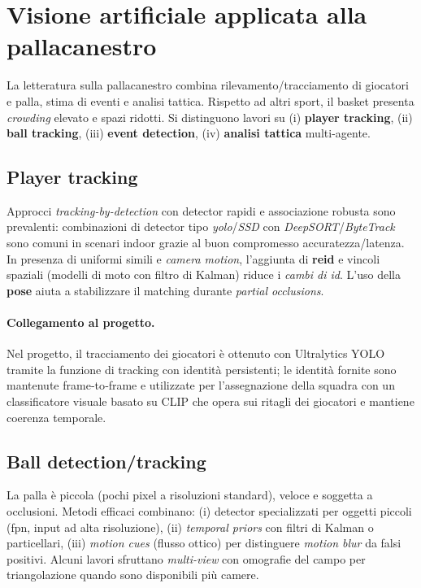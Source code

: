 \documentclass[12pt,a4paper,openright,twoside]{book}
\begin{document}
\section{Visione artificiale applicata alla pallacanestro}
\label{sec:cv-applicata-basket}

La letteratura sulla pallacanestro combina rilevamento/tracciamento di giocatori e palla, stima di eventi e analisi tattica.
Rispetto ad altri sport, il basket presenta \emph{crowding} elevato e spazi ridotti. Si distinguono lavori su 
(i) \textbf{player tracking}, (ii) \textbf{ball tracking}, (iii) \textbf{event detection}, 
(iv) \textbf{analisi tattica} multi-agente.

\subsection{Player tracking}
Approcci \emph{tracking-by-detection} con detector rapidi e associazione robusta sono prevalenti: combinazioni di 
detector tipo \textit{\ac{yolo}}/\textit{SSD} con \textit{DeepSORT}/\textit{ByteTrack} sono comuni in scenari indoor 
grazie al buon compromesso accuratezza/latenza. In presenza di uniformi simili e \emph{camera motion}, l'aggiunta di 
\textbf{\ac{reid}} e vincoli spaziali (modelli di moto con filtro di Kalman) riduce i \emph{cambi di \ac{id}}. L'uso della
\textbf{pose} aiuta a stabilizzare il matching durante \emph{partial occlusions}.

\paragraph{Collegamento al progetto.} Nel progetto, il tracciamento dei giocatori è ottenuto con Ultralytics YOLO
tramite la funzione di tracking con identità persistenti; le identità fornite sono mantenute frame‑to‑frame e
utilizzate per l’assegnazione della squadra con un classificatore visuale basato su CLIP che opera sui ritagli dei
giocatori e mantiene coerenza temporale.

\subsection{Ball detection/tracking}
La palla è piccola (pochi pixel a risoluzioni standard), veloce e soggetta a occlusioni. Metodi efficaci combinano:
(i) detector specializzati per oggetti piccoli (\ac{fpn}, input ad alta risoluzione), (ii) \emph{temporal priors} con filtri
di Kalman o particellari, (iii) \emph{motion cues} (flusso ottico) per distinguere \emph{motion blur} da falsi positivi.
Alcuni lavori sfruttano \emph{multi-view} con omografie del campo per triangolazione quando sono disponibili più camere.
\end{document}
